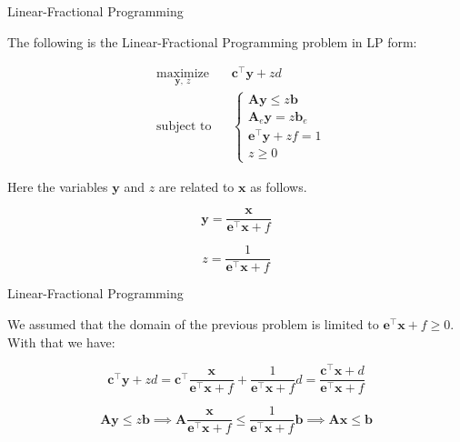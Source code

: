 \documentclass{beamer}
\begin{document}
\begin{frame}{Linear-Fractional Programming}
	\begin{flushleft}
		
		The following is the Linear-Fractional Programming problem in LP form:
		
		\begin{equation}
			\begin{aligned}
				& \underset{\mathbf{y}, \ z}{\text{maximize}}
				& & \mathbf{c}^\top \mathbf{y} + z d \\
				& \text{subject to}
				& & 
				\begin{cases}
					\mathbf{A} \mathbf{y} \leq z \mathbf{b} \\
					\mathbf{A}_e \mathbf{y} = z \mathbf{b}_e \\
					\mathbf{e}^\top \mathbf{y} + z f = 1 \\
					z \geq 0
				\end{cases}
			\end{aligned}
		\end{equation}
		
		Here the variables $\mathbf{y}$ and $z$ are related to $\mathbf{x}$ as follows.
		
		\begin{equation}
			\mathbf{y} = \frac{\mathbf{x}}{\mathbf{e}^\top \mathbf{x} + f}
		\end{equation}
	 
		\begin{equation}
			z = \frac{1}{\mathbf{e}^\top \mathbf{x} + f}
		\end{equation} 
		
	\end{flushleft}
\end{frame}



\begin{frame}{Linear-Fractional Programming}
	\begin{flushleft}
		
		We assumed that the domain of the previous problem is limited to $\mathbf{e}^\top \mathbf{x} + f \geq 0$. With that we have:
		
		\begin{equation}
			 \mathbf{c}^\top \mathbf{y} + z d 
			 = 
			 \mathbf{c}^\top\frac{\mathbf{x}}{\mathbf{e}^\top \mathbf{x} + f} + \frac{1}{\mathbf{e}^\top \mathbf{x} + f} d 
			 =
			 \frac{\mathbf{c}^\top\mathbf{x} + d}{\mathbf{e}^\top \mathbf{x} + f}
		\end{equation}
		
		
		\begin{equation}
			\mathbf{A} \mathbf{y} \leq z \mathbf{b} 
			\implies
			\mathbf{A} \frac{\mathbf{x}}{\mathbf{e}^\top \mathbf{x} + f} \leq \frac{1}{\mathbf{e}^\top \mathbf{x} + f} \mathbf{b} 
			\implies
			\mathbf{A} \mathbf{x} \leq \mathbf{b} 
		\end{equation}
		
		
	\end{flushleft}
\end{frame}
\end{document}
